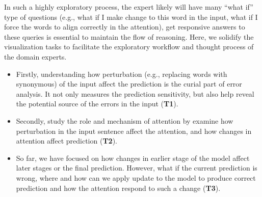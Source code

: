 In such a highly exploratory process, the expert likely will have many ``what if'' type of questions (e.g., what if I make change to this word in the input, what if I force the words to align correctly in the attention), get responsive answers to these queries is essential to maintain the flow of reasoning.
%
Here, we solidify the visualization tasks to facilitate the exploratory workflow and thought process of the domain experts.
%
\begin{itemize}
    \item Firstly, understanding how perturbation (e.g., replacing words with synonymous) of the input affect the prediction is the curial part of error analysis. It not only measures the prediction sensitivity, but also help reveal the potential source of the errors in the input (\textbf{T1}).

    \item Secondly, study the role and mechanism of attention by examine how perturbation in the input sentence affect the attention, and how changes in attention affect prediction (\textbf{T2}).


    \item So far, we have focused on how changes in earlier stage of the model affect later stages or the final prediction. However, what if the current prediction is wrong, where and how can we apply update to the model to produce correct prediction and how the attention respond to such a change (\textbf{T3}).
\end{itemize}
%



